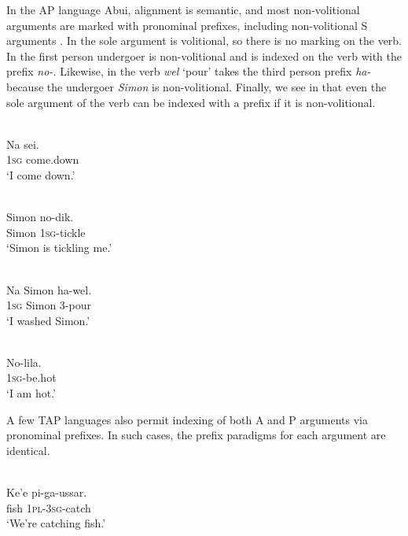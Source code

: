 In the AP language Abui, alignment is semantic, and most non-volitional arguments are marked with pronominal prefixes, including non-volitional S arguments \citep[Chapter~10]{FeddenEtAl2013}. In  the sole argument is volitional, so there is no marking on the verb. In  the first person undergoer is non-volitional and is indexed on the verb with the prefix \textit{no-.} Likewise, in  the verb \textit{wel }`pour' takes the third person prefix \textit{ha-} because the undergoer \textit{Simon} is non-volitional. Finally, we see in  that even the sole argument of the verb can be indexed with a prefix if it is non-volitional.

\ea%
\label{ex:4:4}
 \\
\gll  Na sei. \\
  \textsc{1sg} come.down \\
\glt `I come down.'
\z





\ea%
\label{ex:4:5}
 \\
\gll  Simon no-dik. \\
  Simon \textsc{1sg}-tickle  \\
\glt `Simon is tickling me.'
\z





\ea%
\label{ex:4:6}
 \\
\gll  Na Simon ha-wel. \\
  \textsc{1sg} Simon 3-pour  \\
\glt `I washed Simon.'
\z





\ea%
\label{ex:4:7}
 \\
\gll  No-lila. \\
  \textsc{1sg}-be.hot  \\
\glt `I am hot.'
\z





A few TAP languages also permit indexing of both A and P arguments via pronominal prefixes. In such cases, the prefix paradigms for each argument are identical.

\ea%
\label{ex:4:8}
 \\
\gll  Ke'e pi-ga-ussar. \\
   fish \textsc{1pl-3sg}-catch \\
\glt `We're catching fish.'
\z





